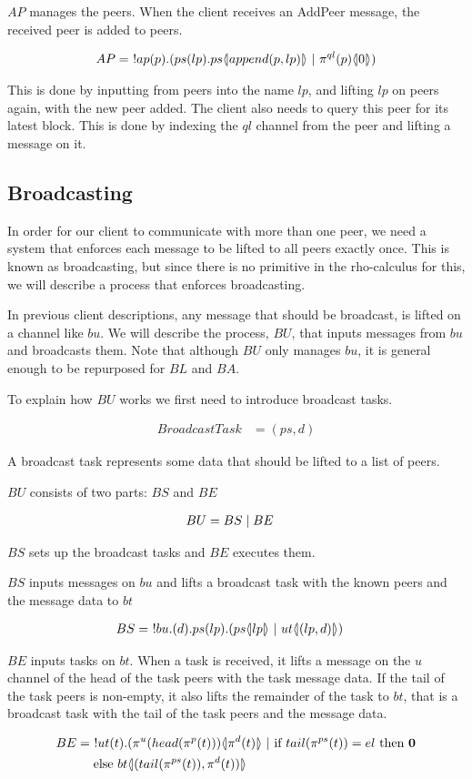 $AP$ manages the peers.
When the client receives an AddPeer message, the received peer is added to peers.

\begin{align*}
    AP &=\ !ap(p).(ps(lp).ps\lift{}{append(p,lp)}\ |\ \pi^{ql}(p)\lift{}{0})\\
\end{align*}

This is done by inputting from peers into the name $lp$, and lifting $lp$ on peers again, with the new peer added.
The client also needs to query this peer for its latest block.
This is done by indexing the $ql$ channel from the peer and lifting a message on it.

\subsection{Broadcasting} \label{broadcast}
In order for our client to communicate with more than one peer, we need a system that enforces each message to be lifted to all peers exactly once.
This is known as broadcasting, but since there is no primitive in the rho-calculus for this, we will describe a process that enforces broadcasting.

In previous client descriptions, any message that should be broadcast, is lifted on a channel like $bu$.
We will describe the process, $BU$, that inputs messages from $bu$ and broadcasts them.
Note that although $BU$ only manages $bu$, it is general enough to be repurposed for $BL$ and $BA$.

To explain how $BU$ works we first need to introduce broadcast tasks.

\begin{align*}
    BroadcastTask &= (ps, d)
\end{align*}

A broadcast task represents some data that should be lifted to a list of peers.

$BU$ consists of two parts: $BS$ and $BE$

\begin{align*}
    BU &= BS \mid BE
\end{align*}

$BS$ sets up the broadcast tasks and $BE$ executes them.

$BS$ inputs messages on $bu$ and lifts a broadcast task with the known peers and the message data to $bt$

\begin{align*}
    BS &=\ !bu.(d).ps(lp).(ps \langle \! | lp | \! \rangle\ |\ ut \langle \! | (lp,d) | \! \rangle)
\end{align*}

$BE$ inputs tasks on $bt$.
When a task is received, it lifts a message on the $u$ channel of the head of the task peers with the task message data.
If the tail of the task peers is non-empty, it also lifts the remainder of the task to $bt$, that is a broadcast task with the tail of the task peers and the message data.

\begin{align*}
    BE &=\ !ut(t).(\pi^{u}(head(\pi^{p}(t)))\lift{}{\pi^{d}(t)}\ |\If{tail(\pi^{ps}(t))=el}{\nil\\
    &\quad}{bt\lift{}{(tail(\pi^{ps}(t)),\pi^{d}(t))}}
\end{align*}
